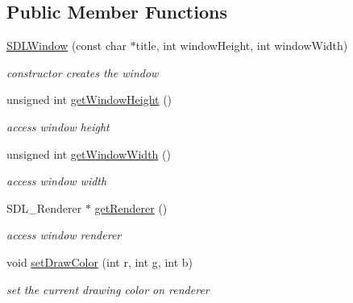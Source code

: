 \subsection*{Public Member Functions}
\begin{DoxyCompactItemize}
\item 
\hypertarget{class_s_d_l_window_a76e381a841732cff7df123f8794327a8}{}\label{class_s_d_l_window_a76e381a841732cff7df123f8794327a8} 
\hyperlink{class_s_d_l_window_a76e381a841732cff7df123f8794327a8}{S\+D\+L\+Window} (const char $\ast$title, int window\+Height, int window\+Width)
\begin{DoxyCompactList}\small\item\em constructor creates the window \end{DoxyCompactList}\item 
\hypertarget{class_s_d_l_window_a0770d83515721758000ad53f8d507989}{}\label{class_s_d_l_window_a0770d83515721758000ad53f8d507989} 
unsigned int \hyperlink{class_s_d_l_window_a0770d83515721758000ad53f8d507989}{get\+Window\+Height} ()
\begin{DoxyCompactList}\small\item\em access window height \end{DoxyCompactList}\item 
\hypertarget{class_s_d_l_window_a71ba67ab21ab430834daedb2a0104d3e}{}\label{class_s_d_l_window_a71ba67ab21ab430834daedb2a0104d3e} 
unsigned int \hyperlink{class_s_d_l_window_a71ba67ab21ab430834daedb2a0104d3e}{get\+Window\+Width} ()
\begin{DoxyCompactList}\small\item\em access window width \end{DoxyCompactList}\item 
\hypertarget{class_s_d_l_window_a9a6d80f754ee6209be95d6c964dea85e}{}\label{class_s_d_l_window_a9a6d80f754ee6209be95d6c964dea85e} 
S\+D\+L\+\_\+\+Renderer $\ast$ \hyperlink{class_s_d_l_window_a9a6d80f754ee6209be95d6c964dea85e}{get\+Renderer} ()
\begin{DoxyCompactList}\small\item\em access window renderer \end{DoxyCompactList}\item 
\hypertarget{class_s_d_l_window_ac1781feda310df19446cf82376f9887d}{}\label{class_s_d_l_window_ac1781feda310df19446cf82376f9887d} 
void \hyperlink{class_s_d_l_window_ac1781feda310df19446cf82376f9887d}{set\+Draw\+Color} (int r, int g, int b)
\begin{DoxyCompactList}\small\item\em set the current drawing color on renderer \end{DoxyCompactList}\item 

\end{DoxyCompactItemize}
